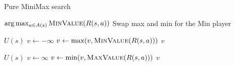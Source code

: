 \begin{algorithm}[H]
    \caption{Pure MiniMax search}
    \label{alg:minimax}
    \begin{algorithmic}[1]
    
        \State \Return $\arg\max_{a \in A(s)} \textproc{MinValue}(R(s, a))$ 
        \Comment Swap max and min for the Min player
    \EndProcedure
    \end{algorithmic}

    \begin{algorithmic}[1]

            \Return $U(s)$
        \EndIf
        \State $v \leftarrow -\infty$
            \State $v \leftarrow \max(v, \textproc{MinValue}(R(s, a)))$
        \EndFor
        \State \Return $v$
    \EndProcedure
    
    \end{algorithmic}
        
    \begin{algorithmic}[1]

            \Return $U(s)$
        \EndIf
        \State $v \leftarrow \infty$
            \State $v \leftarrow \min(v, \textproc{MaxValue}(R(s, a)))$
        \EndFor
        \State \Return $v$
    \EndProcedure

    \end{algorithmic}
\end{algorithm}